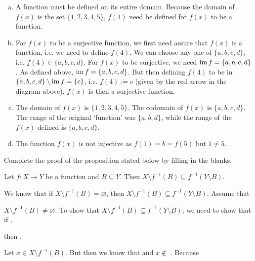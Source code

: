 \documentclass[11pt,letterpaper]{article}
\begin{document}
\sol 
\begin{enumerate}[(a)]
\item A function must be defined on its entire domain. Because the domain of $f(x)$ is the set $\{ 1, 2, 3, 4, 5 \}$, $f(4)$ need be defined for $f(x)$ to be a function. \pspace

\item For $f(x)$ to be a surjective function, we first need assure that $f(x)$ is a function, i.e. we need to define $f(4)$. We can choose any one of $\{ a, b, c, d \}$, i.e. $f(4) \in \{ a, b, c, d \}$. For $f(x)$ to be surjective, we need $\operatorname{im} f= \{ a, b, c, d \}$. As defined above, $\operatorname{im} f= \{ a, b, c, d \}$. But then defining $f(4)$ to be in $\{ a, b, c, d \} \setminus \operatorname{im} f= \{ c \}$, i.e. $f(4):= c$ (given by the red arrow in the diagram above), $f(x)$ is then a surjective function. \pspace

\item The domain of $f(x)$ is $\{ 1, 2, 3, 4, 5 \}$. The codomain of $f(x)$ is $\{ a, b, c, d \}$. The range of the original `function' was $\{ a, b, d \}$, while the range of the $f(x)$ defined is $\{ a, b, c, d \}$. \pspace

\item The function $f(x)$ is not injective as $f(1)= b= f(5)$ but $1 \neq 5$. 
\end{enumerate}



\newpage



 Complete the proof of the proposition stated below by filling in the blanks. \pspace

 Let $f: X \to Y$ be a function and $B \subseteq Y$. Then $X \setminus f^{-1}(B) \subseteq f^{-1}(Y \setminus B)$. \pspace

 We know that if $X \setminus f^{-1}(B)= \varnothing$, then $X \setminus f^{-1}(B) \subseteq f^{-1}(Y \setminus B)$. Assume that \pspace

$X \setminus f^{-1}(B)\neq \varnothing$. To show that $X \setminus f^{-1}(B) \subseteq f^{-1}(Y \setminus B)$, we need to show that if , \pspace

then . \pvspace{0.7cm}

Let $x \in X \setminus f^{-1}(B)$. But then we know that  and $x \notin$ . Because \pspace
\end{document}
